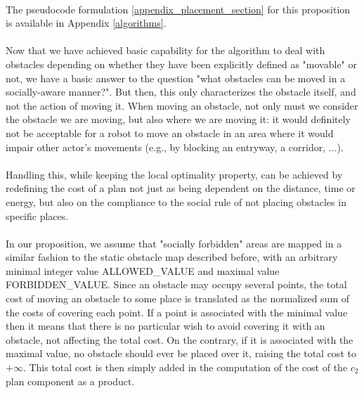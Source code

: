 \paragraph{} The pseudocode formulation \ref{appendix_placement_section} for this proposition is available in Appendix \ref{algorithms}.

\paragraph{} Now that we have achieved basic capability for the algorithm to deal with obstacles depending on whether they have been explicitly defined as "movable" or not, we have a basic answer to the question "what obstacles can be moved in a socially-aware manner?". But then, this only characterizes the obstacle itself, and not the action of moving it. When moving an obstacle, not only must we consider the obstacle we are moving, but also where we are moving it: it would definitely not be acceptable for a robot to move an obstacle in an area where it would impair other actor's movements (e.g., by blocking an entryway, a corridor, ...).

\paragraph{} Handling this, while keeping the local optimality property, can be achieved by redefining the cost of a plan not just as being dependent on the distance, time or energy, but also on the compliance to the social rule of not placing obstacles in specific places.

\paragraph{} In our proposition, we assume that "socially forbidden" areas are mapped in a similar fashion to the static obstacle map described before, with an arbitrary minimal integer value ALLOWED\_VALUE and maximal value FORBIDDEN\_VALUE. Since an obstacle may occupy several points, the total cost of moving an obstacle to some place is translated as the normalized sum of the costs of covering each point. If a point is associated with the minimal value then it means that there is no particular wish to avoid covering it with an obstacle, not affecting the total cost. On the contrary, if it is associated with the maximal value, no obstacle should ever be placed over it, raising the total cost to $+\infty$. This total cost is then simply added in the computation of the cost of the $c_{2}$ plan component as a product.

